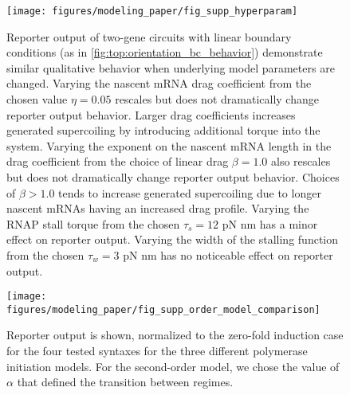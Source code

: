 \documentclass[11pt]{article}
\begin{document}
\begin{figure}[hbtp]
    \centering
    {\texttt{[image: figures/modeling\_paper/fig\_supp\_hyperparam]}
    \label{fig:hyperparam_drag_coeff}
    \label{fig:hyperparam_drag_exponent}
    \label{fig:hyperparam_stall_torque}
    \label{fig:hyperparam_stall_width}
    }
    \caption{Reporter output of two-gene circuits with linear boundary conditions (as in \cref{fig:top:orientation_bc_behavior}) demonstrate similar qualitative behavior when underlying model parameters are changed.
         Varying the nascent mRNA drag coefficient from the chosen value \(\eta = 0.05\) rescales but does not dramatically change reporter output behavior. Larger drag coefficients increases generated supercoiling by introducing additional torque into the system.
         Varying the exponent on the nascent mRNA length in the drag coefficient from the choice of linear drag \(\beta = 1.0\) also rescales but does not dramatically change reporter output behavior. Choices of \(\beta > 1.0\) tends to increase generated supercoiling due to longer nascent mRNAs having an increased drag profile.
         Varying the RNAP stall torque from the chosen \(\tau_s = 12\) pN nm has a minor effect on reporter output.
         Varying the width of the stalling function from the chosen \(\tau_w = 3\) pN nm has no noticeable effect on reporter output.
    }
    \label{fig:top:hyperparam}
\end{figure}

\begin{figure}[htbp]
    \centering
    {\texttt{[image: figures/modeling\_paper/fig\_supp\_order\_model\_comparison]}
    \label{fig:supp:initation_order_comparison}
    \label{fig:supp:alpha_reporter_counts}
    }
    \caption{
         Reporter output is shown, normalized to the zero-fold induction case for the four tested syntaxes for the three different polymerase initiation models.
         For the second-order model, we chose the value of \(\alpha\) that defined the transition between regimes.
    }
    \label{fig:top:supp_model_comparison}
\end{figure}
\end{document}
